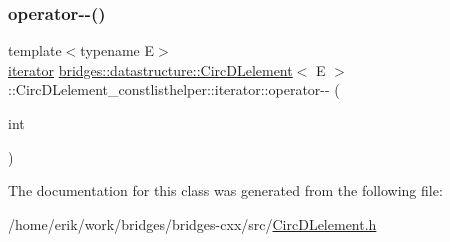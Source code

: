 \mbox{\label{classbridges_1_1datastructure_1_1_circ_d_lelement_1_1_circ_d_lelement__constlisthelper_1_1iterator_a1f40545d68c46c28ab56447cd97c1924}} 
\subsubsection{\texorpdfstring{operator-\/-\/()}{operator--()}\hspace{0.1cm}{\footnotesize\ttfamily [2/2]}}
{\footnotesize\ttfamily template$<$typename E$>$ \\
\hyperlink{classbridges_1_1datastructure_1_1_circ_d_lelement_1_1_circ_d_lelement__constlisthelper_1_1iterator}{iterator} \hyperlink{classbridges_1_1datastructure_1_1_circ_d_lelement}{bridges\+::datastructure\+::\+Circ\+D\+Lelement}$<$ E $>$\+::Circ\+D\+Lelement\+\_\+constlisthelper\+::iterator\+::operator-\/-\/ (\begin{DoxyParamCaption}\item[{int}]{ }\end{DoxyParamCaption})\hspace{0.3cm}{\ttfamily [inline]}}



The documentation for this class was generated from the following file\+:\begin{DoxyCompactItemize}
\item 
/home/erik/work/bridges/bridges-\/cxx/src/\hyperlink{_circ_d_lelement_8h}{Circ\+D\+Lelement.\+h}\end{DoxyCompactItemize}
